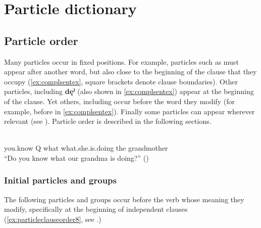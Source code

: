 \chapter{Particle dictionary} \label{ch:particle dictionary}
\section{Particle order} \label{ch:particle order}
Many particles occur in fixed positions. For example, particles such as  must appear after another word, but also close to the beginning of the clause that they occupy (\ref{ex:complsentex}, square brackets denote clause boundaries). Other particles, including \textbf{dęˀ} (also shown in \ref{ex:complsentex}) appear at the beginning of the clause. Yet others, including  occur before the word they modify (for example, before  in \ref{ex:complsentex}). Finally some particles can appear wherever relevant (see ). Particle order is described in the following sections.


\ea
\label{ex:complsentex}
\\
you.know Q what what.she.is.doing the grandmother\\
\glt “Do you know what our grandma is doing?” (\cite{henry_de_2005})
\z

\subsection*{Initial particles and groups}
The following particles and groups occur before the verb whose meaning they modify, specifically at the beginning of independent clauses (\ref{ex:particleclauseorder8}, see .) 


